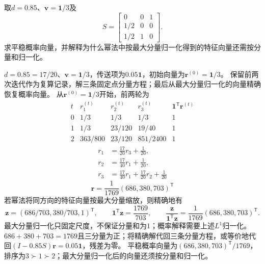 \begin{example}[三结点幂法与概率归一化]\label{exm:V5-C07-power-three}
取$d=0.85$、$\boldsymbol v=\boldsymbol1/3$及
\[
S=\begin{bmatrix}0&0&1\\1/2&0&0\\1/2&1&0\end{bmatrix}.
\]
求平稳概率向量，并解释为什么幂法中按最大分量归一化得到的特征向量还需按分量和归一化。
\end{example}
\begin{solution}
\SolGiven $d=0.85=17/20$、$\boldsymbol v=\boldsymbol1/3$，传送项为$0.05\boldsymbol1$，初始向量为$\boldsymbol r^{(0)}=\boldsymbol1/3$。
\SolPlan 保留前两次迭代作为复算记录，解三条固定点分量方程；最后从最大分量归一化的向量精确恢复概率向量。
\SolDerive
从$\boldsymbol r^{(0)}=\boldsymbol1/3$开始，前两轮为
\[
\begin{array}{c|ccc|c}
t&r_1^{(t)}&r_2^{(t)}&r_3^{(t)}&\boldsymbol1^{\mathsf T}\boldsymbol r^{(t)}\\\hline
0&1/3&1/3&1/3&1\\
1&1/3&23/120&19/40&1\\
2&363/800&23/120&851/2400&1
\end{array}
\]
\[
\begin{aligned}
r_1&=\tfrac{17}{20}r_3+\tfrac1{20},\\
r_2&=\tfrac{17}{40}r_1+\tfrac1{20},\\
r_3&=\tfrac{17}{40}r_1+\tfrac{17}{20}r_2+\tfrac1{20}
\end{aligned}
\]
\[
\boldsymbol r=\frac1{1769}(686,380,703)^{\mathsf T}
\]
若幂法将同方向的特征向量按最大分量缩放，则精确地有
\[
\boldsymbol z=(686/703,380/703,1)^{\mathsf T},\qquad
\boldsymbol1^{\mathsf T}\boldsymbol z=\frac{1769}{703},\qquad
\frac{\boldsymbol z}{\boldsymbol1^{\mathsf T}\boldsymbol z}
=\frac1{1769}(686,380,703)^{\mathsf T}.
\]
最大分量归一化只固定尺度，不保证分量和为$1$；概率解释需要上述$L^1$归一化。
\SolCheck $686+380+703=1769$且三分量为正；将精确解代回三条分量方程，或等价地代回$(I-0.85S)\boldsymbol r=0.05\boldsymbol1$，残差为零。
\SolAnswer 平稳概率向量为$(686,380,703)^{\mathsf T}/1769$，排序为$3\succ1\succ2$；最大分量归一化后的向量还须按分量和归一化。
\end{solution}

